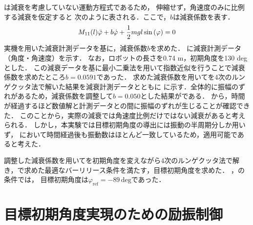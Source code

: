          は減衰を考慮していない運動方程式であるため，
          伸縮せず，角速度のみに比例する減衰を仮定すると
          次のように表される．ここで，$b$は減衰係数を表す．
          \begin{eqnarray}
            \equlabel{dampingEquation}
            M_{11}(l)\ddot{\varphi}+b\dot{\varphi}+\frac{1}{2}mgl\sin{(\varphi)}=0          
            \end{eqnarray}
          実機を用いた減衰計測データを基に，減衰係数$b$を求めた．
          \figref{}に減衰計測データ（角度・角速度）を示す．
          なお，ロボットの長さを0.74 m，初期角度を130 degとした．
          この減衰データを基に最小二乗法を用いて指数近似を行うことで減衰係数を求めたところ$b=0.0591$であった．
          求めた減衰係数を用いてを4次のルンゲクッタ法で解いた結果を減衰計測データとともに
          \figref{}に示す．全体的に振幅のずれがあるため，減衰係数を調整して$b=0.050$とした結果が\figref{}である．
          \figref{}から，時間が経過するほど数値解と計測データとの間に振幅のずれが生じることが確認できた．
          このことから，実際の減衰では角速度比例だけではない減衰があると考えられる．
          しかし，本実験では目標初期角度の導出には振動の半周期分しか用いず，
          \figref{}において時間経過後も振動数はほとんど一致しているため，適用可能であると考えた．

          調整した減衰係数を用いてを初期角度を変えながら4次のルンゲクッタ法で解き，で求めた最適なバーリリース条件を満たす，目標初期角度を求めた．
          ，の条件では，
          目標初期角度は$\varphi_{\mathrm{ref}}=-89\,\mathrm{deg}$であった．
          

          \section{目標初期角度実現のための励振制御}
          
